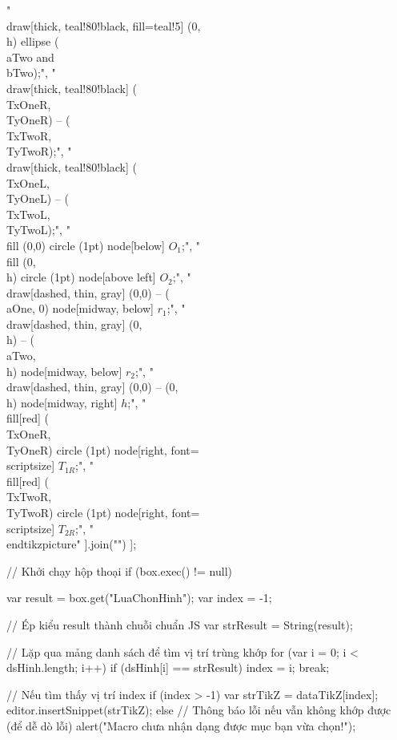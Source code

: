 "\t\\draw[thick, teal!80!black, fill=teal!5] (0, \\h) ellipse ({\\aTwo} and {\\bTwo});",
"\t\\draw[thick, teal!80!black] (\\TxOneR, \\TyOneR) -- (\\TxTwoR, \\TyTwoR);",
"\t\\draw[thick, teal!80!black] (\\TxOneL, \\TyOneL) -- (\\TxTwoL, \\TyTwoL);",
"\t\\fill (0,0) circle (1pt) node[below] {$O_1$};",
"\t\\fill (0,\\h) circle (1pt) node[above left] {$O_2$};",
"\t\\draw[dashed, thin, gray] (0,0) -- (\\aOne, 0) node[midway, below] {$r_1$};",
"\t\\draw[dashed, thin, gray] (0,\\h) -- (\\aTwo, \\h) node[midway, below] {$r_2$};",
"\t\\draw[dashed, thin, gray] (0,0) -- (0,\\h) node[midway, right] {$h$};",
"\t\\fill[red] (\\TxOneR, \\TyOneR) circle (1pt) node[right, font=\\scriptsize] {$T_{1R}$};",
"\t\\fill[red] (\\TxTwoR, \\TyTwoR) circle (1pt) node[right, font=\\scriptsize] {$T_{2R}$};",
"\\end{tikzpicture}"
].join("\n")
];

// Khởi chạy hộp thoại
if (box.exec() != null) {
	var result = box.get("LuaChonHinh");
	var index = -1;
	
	// Ép kiểu result thành chuỗi chuẩn JS
	var strResult = String(result);
	
	// Lặp qua mảng danh sách để tìm vị trí trùng khớp
	for (var i = 0; i < dsHinh.length; i++) {
		if (dsHinh[i] == strResult) {
			index = i;
			break;
		}
	}
	
	// Nếu tìm thấy vị trí index
	if (index > -1) {
		var strTikZ = dataTikZ[index];
		editor.insertSnippet(strTikZ);
	} else {
		// Thông báo lỗi nếu vẫn không khớp được (để dễ dò lỗi)
		alert("Macro chưa nhận dạng được mục bạn vừa chọn!");
	}
}